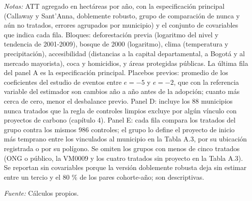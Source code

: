 \begin{table}[htbp]
\begin{threeparttable}
\begin{tablenotes}[flushleft]
\item \textit{Notas:} ATT agregado en hectáreas por año, con la especificación principal (Callaway y Sant'Anna, doblemente robusto, grupo de comparación de nunca y aún no tratados, errores agrupados por municipio) y el conjunto de covariables que indica cada fila. Bloques: deforestación previa (logaritmo del nivel y tendencia de 2001-2009), bosque de 2000 (logaritmo), clima (temperatura y precipitación), accesibilidad (distancias a la capital departamental, a Bogotá y al mercado mayorista), coca y homicidios, y áreas protegidas públicas. La última fila del panel A es la especificación principal. Placebos previos: promedio de los coeficientes del estudio de eventos entre $e = -5$ y $e = -2$, que con la referencia variable del estimador son cambios año a año antes de la adopción; cuanto más cerca de cero, menor el desbalance previo. Panel D: incluye los 88 municipios nunca tratados que la regla de controles limpios excluye por algún vínculo con proyectos de carbono (capítulo 4). Panel E: cada fila compara los tratados del grupo contra los mismos 986 controles; el grupo lo define el proyecto de inicio más temprano entre los vinculados al municipio en la Tabla A.3, por su ubicación registrada o por su polígono. Se omiten los grupos con menos de cinco tratados (ONG o público, la VM0009 y los cuatro tratados sin proyecto en la Tabla A.3). Se reportan sin covariables porque la versión doblemente robusta deja sin estimar entre un tercio y el 80 \% de los pares cohorte-año; son descriptivas.
\item \textit{Fuente:} Cálculos propios.
\end{tablenotes}
\end{threeparttable}
\end{table}

